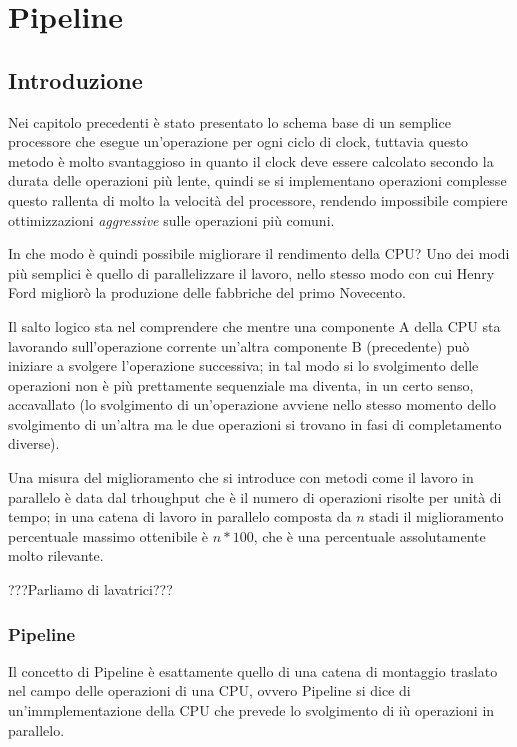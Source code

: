 \documentclass[class=book, crop=false, oneside]{standalone}
\begin{document}
\chapter{Pipeline}

\section{Introduzione}
Nei capitolo precedenti è stato presentato lo schema base di un semplice processore che esegue un'operazione per ogni ciclo di clock, tuttavia questo metodo è molto svantaggioso in quanto il clock deve essere calcolato secondo la durata delle operazioni più lente, quindi se si implementano operazioni complesse questo rallenta di molto la velocità del processore, rendendo impossibile compiere ottimizzazioni \emph{aggressive} sulle operazioni più comuni.

In che modo è quindi possibile migliorare il rendimento della CPU?
Uno dei modi più semplici è quello di parallelizzare il lavoro, nello stesso modo con cui Henry Ford migliorò la produzione delle fabbriche del primo Novecento.

Il salto logico sta nel comprendere che mentre una componente A della CPU sta lavorando sull'operazione corrente un'altra componente B (precedente) può iniziare a svolgere l'operazione successiva; in tal modo si lo svolgimento delle operazioni non è più prettamente sequenziale ma diventa, in un certo senso, accavallato (lo svolgimento di un'operazione avviene nello stesso momento dello svolgimento di un'altra ma le due operazioni si trovano in fasi di completamento diverse).

Una misura del miglioramento che si introduce con metodi come il lavoro in parallelo è data dal trhoughput che è il numero di operazioni risolte per unità di tempo; in una catena di lavoro in parallelo composta da \(n\) stadi il miglioramento percentuale massimo ottenibile è \(n*100\), che è una percentuale assolutamente molto rilevante.

???Parliamo di lavatrici???

\subsection*{Pipeline}
Il concetto di Pipeline è esattamente quello di una catena di montaggio traslato nel campo delle operazioni di una CPU, ovvero Pipeline si dice di un'immplementazione della CPU che prevede lo svolgimento di iù operazioni in parallelo.
\end{document}
